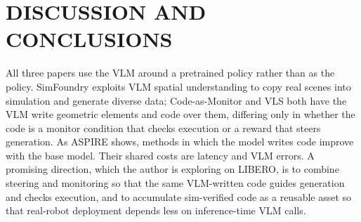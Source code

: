\documentclass[letterpaper, 10 pt, conference]{ieeeconf}
\begin{document}
\section{DISCUSSION AND CONCLUSIONS}
All three papers use the VLM around a pretrained policy rather than as the policy. SimFoundry exploits VLM spatial understanding to copy real scenes into simulation and generate diverse data; Code-as-Monitor and VLS both have the VLM write geometric elements and code over them, differing only in whether the code is a monitor condition that checks execution or a reward that steers generation. As ASPIRE shows, methods in which the model writes code improve with the base model. Their shared costs are latency and VLM errors. A promising direction, which the author is exploring on LIBERO, is to combine steering and monitoring so that the same VLM-written code guides generation and checks execution, and to accumulate sim-verified code as a reusable asset so that real-robot deployment depends less on inference-time VLM calls.

\balance


\end{document}
